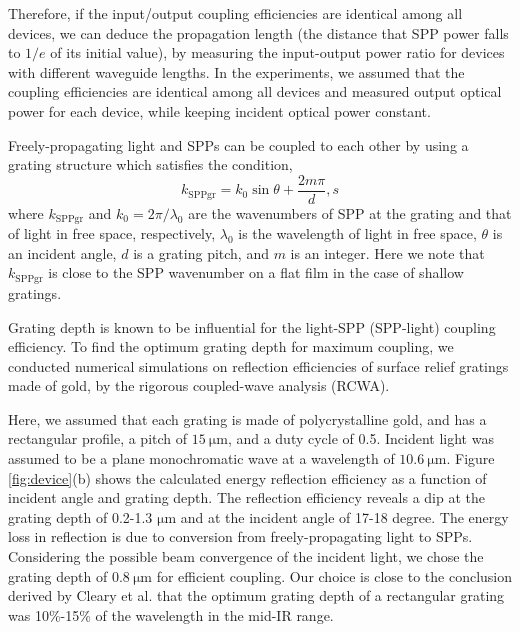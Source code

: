 \documentclass[aip,apl,reprint]{revtex4-1}
\begin{document}
Therefore, if the input/output coupling efficiencies are identical among all devices, we can deduce the propagation length (the distance that SPP power falls to $1/e$ of its initial value), by measuring the input-output power ratio for devices with different waveguide lengths.  In the experiments, we assumed that the coupling efficiencies are identical among all devices and measured output optical power for each device, while keeping incident optical power constant. 

Freely-propagating light and SPPs can be coupled to each other by using a grating structure which satisfies the condition\cite{Koev},
\begin{equation}
k_{\mathrm{SPPgr}}=k_0 \sin \theta + \frac{2m\pi}{d},
\label{eq:phase-match}s
\end{equation}
where $k_{\mathrm{SPPgr}}$ and $k_0=2\pi/\lambda_0$ are the wavenumbers of SPP at the grating and that of light in free space, respectively, $\lambda_0$ is the wavelength of light in free space, $\theta$ is an incident angle, $d$ is a grating pitch, and $m$ is an integer. Here we note that $k_{\mathrm{SPPgr}}$ is close to the SPP wavenumber on a flat film in the case of shallow gratings.

Grating depth is known to be influential for the light-SPP (SPP-light) coupling efficiency\cite{Koev, Cleary2010}. To find the optimum grating depth for maximum coupling, we conducted numerical simulations on reflection efficiencies of surface relief gratings made of gold, by the rigorous coupled-wave analysis (RCWA)\cite{Moharam}. 

Here, we assumed that each grating is made of polycrystalline gold, and has a rectangular profile, a pitch of $15\:\mathrm{\mu m}$, and a duty cycle of 0.5. Incident light was assumed to be a plane monochromatic wave at a wavelength of $10.6\:\mathrm{\mu m}$. 
Figure \ref{fig:device}(b) shows the calculated energy reflection efficiency as a function of incident angle and grating depth. The reflection efficiency reveals a dip at the grating depth of 0.2-1.3 $\mathrm{\mu m}$ and at the incident angle of 17-18 degree. The energy loss in reflection is due to conversion from freely-propagating light to SPPs.
Considering the possible beam convergence of the incident light, we chose the grating depth of $0.8\:\mathrm{\mu m}$ for efficient coupling. Our choice is close to the conclusion derived by Cleary et al.\cite{Cleary2010} that the optimum grating depth of a rectangular grating was 10\%-15\% of the wavelength in the mid-IR range.
\end{document}
